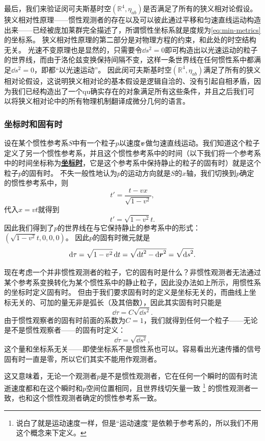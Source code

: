\documentclass[hyperref, UTF8, a4paper]{ctexart}
\newcommand*{\concept}[1]{\underline{\textbf{#1}}}
\begin{document}
最后，我们来验证闵可夫斯基时空$(\mathbb{R}^4, \eta_{ab})$是否满足了所有的狭义相对论假设。
狭义相对性原理——惯性观测者的存在以及可以彼此通过平移和匀速直线运动构造出来——已经被庞加莱群完全描述了，所谓惯性坐标系就是度规为\eqref{eq:min-metrics}的坐标系。
狭义相对性原理的第二部分是对物理方程的约束，和此处的时空结构无关。
光速不变原理也是显然的，只需要令$\dd{s}^2=0$即可构造出以光速运动的粒子的世界线，而由于洛伦兹变换保持间隔不变，这样一条世界线在任何惯性系中都满足$\dd{s}^2=0$，即都“以光速运动”。
因此闵可夫斯基时空$(\mathbb{R}^4, \eta_{ab})$满足了所有的狭义相对论假设，这说明狭义相对论的基本假设是逻辑自洽的、没有引起自相矛盾，因为我们已经构造出了一个qu确实存在的对象满足所有这些条件，并且之后我们可以将狭义相对论中的所有物理机制翻译成微分几何的语言。

\subsubsection{坐标时和固有时}

设在某个惯性参考系$S$中有一个粒子$p$以速度$\vb*{v}$做匀速直线运动。我们知道这个粒子定义了另一个惯性参考系，并且这个惯性参考系中的时间（以下我们将一个参考系中的时间坐标称为\concept{坐标时}，它是这个参考系中保持静止的粒子的固有时）就是这个粒子$p$的固有时。
不失一般性地认为$p$的运动方向就是$S$的$x$轴，我们切换到$p$确定的惯性参考系中，则
\[
    t' = \frac{t - vx}{\sqrt{1 - v^2}},
\]
代入$x = vt$就得到
\[
    t' = \sqrt{1 - v^2} t.
\]
因此我们得到了$p$的世界线在与它保持静止的参考系中的形式：$(\sqrt{1 - v^2}t, 0, 0, 0)$。
因此$p$的固有时微元就是
\begin{equation}
    \dd{\tau} = \sqrt{1 - v^2} \dd{t} = \sqrt{\dd{t}^2 - \dd{\vb*{r}}^2} = \sqrt{\dd{s}^2}.
\end{equation}

现在考虑一个并非惯性观测者的粒子，它的固有时是什么？非惯性观测者无法通过某个参考系变换转化为某个惯性系中的静止粒子，因此没办法如上所示，用惯性系的坐标时定义固有时。
但由于我们要求固有时的定义是坐标无关的，而曲线上坐标无关的、可加的量无非是弧长（及其倍数），因此其实固有时只能是
\[
    \dd{\tau} = C \sqrt{\dd{s}^2}.
\]
由于惯性观察者的固有时前面的系数为$C=1$，我们就得到任何一个粒子——无论是不是惯性观察者——的固有时定义：
\begin{equation}
    \dd{\tau} = \sqrt{\dd{s}^2},
\end{equation}
这个量和坐标系无关——即使坐标系不是惯性系也可以。容易看出光速传播的信号固有时一直是零，所以它们其实不能用作观测者。

这又意味着，无论一个观测者$p$是不是惯性观测者，它在任何一个瞬时的固有时流逝速度都和在这个瞬时和$p$空间位置相同，且世界线切矢量一致%
\footnote{
    说白了就是运动速度一样，但是“运动速度”是依赖于参考系的，所以我们不用这个概念来下定义。
}%
的惯性观测者一致，也和这个惯性观测者确定的惯性参考系一致。
\end{document}
